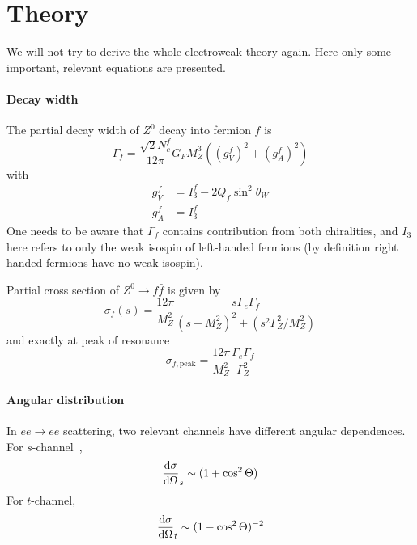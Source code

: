 \section{Theory}
We will not try to derive the whole electroweak theory again. Here only some important, relevant equations are presented.

\paragraph{Decay width}
The partial decay width of $Z^0$ decay into fermion $f$ is~\cite{manual}
\begin{equation}
	\Gamma_f = \frac{ \sqrt{2} N_c^f}{12\pi} G_F M_Z^3 \left( (g_V^f)^2 + (g_A^f)^2  \right)
	\label{math:Gammaf}
\end{equation}
with
\begin{align*}
	g_V^f &= I_3^f - 2 Q_f \sin^2 \theta_W \\
	g_A^f &= I_3^f 
\end{align*}
One needs to be aware that $\Gamma_f$ contains contribution from both chiralities, and $I_3$ here refers to only the weak isospin of left-handed fermions (by definition right handed fermions have no weak isospin).

Partial cross section of $Z^0 \rightarrow f\bar{f}$ is given by~\cite{manual}
\begin{equation}
	\sigma_f(s) = \frac{12 \pi}{M_Z^2} \frac{s \Gamma_e \Gamma_f}{ (s-M_Z^2)^2 + (s^2 \Gamma^2_Z / M_Z^2)}
	\label{math:sigmaf}
\end{equation}
and exactly at peak of resonance
\begin{equation}
	\sigma_{f, \text{peak}} = \frac{12 \pi}{M_Z^2} \frac{\Gamma_e \Gamma_f}{\Gamma_Z^2}
	\label{math:sigmafPeak}
\end{equation}

\paragraph{Angular distribution}
In $ee \rightarrow ee$ scattering, two relevant channels have different angular dependences. For $s$-channel~\cite{manual},
\begin{equation}
	\dv{\sigma}{\Omega}_s \sim (1 + \cos^2 \Theta)
	\label{math:diffCrossS}
\end{equation}
For $t$-channel,
\begin{equation}
	\dv{\sigma}{\Omega}_t \sim (1-\cos^2 \Theta)^{-2}
	\label{math:diffCrossT}
\end{equation}


